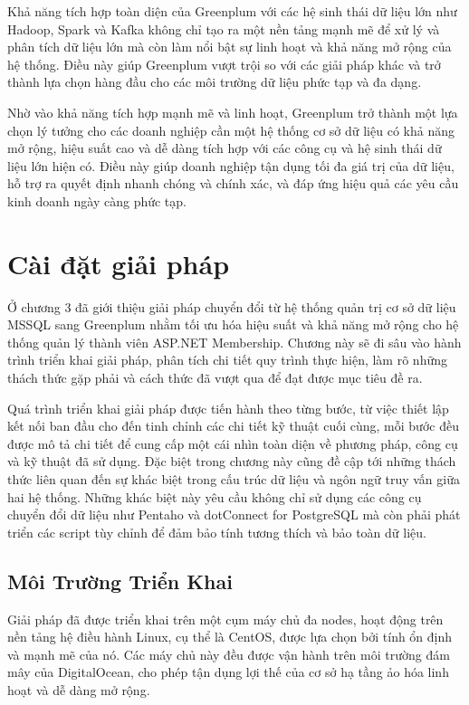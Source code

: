 \documentclass[14pt]{article}
\begin{document}
Khả năng tích hợp toàn diện của Greenplum với các hệ sinh thái dữ liệu lớn như Hadoop, Spark và Kafka không chỉ tạo ra một nền tảng mạnh mẽ để xử lý và phân tích dữ liệu lớn mà còn làm nổi bật sự linh hoạt và khả năng mở rộng của hệ thống. Điều này giúp Greenplum vượt trội so với các giải pháp khác và trở thành lựa chọn hàng đầu cho các môi trường dữ liệu phức tạp và đa dạng.

Nhờ vào khả năng tích hợp mạnh mẽ và linh hoạt, Greenplum trở thành một lựa chọn lý tưởng cho các doanh nghiệp cần một hệ thống cơ sở dữ liệu có khả năng mở rộng, hiệu suất cao và dễ dàng tích hợp với các công cụ và hệ sinh thái dữ liệu lớn hiện có. Điều này giúp doanh nghiệp tận dụng tối đa giá trị của dữ liệu, hỗ trợ ra quyết định nhanh chóng và chính xác, và đáp ứng hiệu quả các yêu cầu kinh doanh ngày càng phức tạp.



\section{Cài đặt giải pháp}

Ở chương 3 đã giới thiệu giải pháp chuyển đổi từ hệ thống quản trị cơ sở dữ liệu MSSQL sang Greenplum nhằm tối ưu hóa hiệu suất và khả năng mở rộng cho hệ thống quản lý thành viên ASP.NET Membership. Chương này sẽ đi sâu vào hành trình triển khai giải pháp, phân tích chi tiết quy trình thực hiện, làm rõ những thách thức gặp phải và cách thức đã vượt qua để đạt được mục tiêu đề ra.

Quá trình triển khai giải pháp được tiến hành theo từng bước, từ việc thiết lập kết nối ban đầu cho đến tinh chỉnh các chi tiết kỹ thuật cuối cùng, mỗi bước đều được mô tả chi tiết để cung cấp một cái nhìn toàn diện về phương pháp, công cụ và kỹ thuật đã sử dụng. Đặc biệt trong chương này cũng đề cập tới những thách thức liên quan đến sự khác biệt trong cấu trúc dữ liệu và ngôn ngữ truy vấn giữa hai hệ thống. Những khác biệt này yêu cầu không chỉ sử dụng các công cụ chuyển đổi dữ liệu như Pentaho và dotConnect for PostgreSQL mà còn phải phát triển các script tùy chỉnh để đảm bảo tính tương thích và bảo toàn dữ liệu.


\subsection{Môi Trường Triển Khai}

Giải pháp đã được triển khai trên một cụm máy chủ đa nodes, hoạt động trên nền tảng hệ điều hành Linux, cụ thể là CentOS, được lựa chọn bởi tính ổn định và mạnh mẽ của nó. Các máy chủ này đều được vận hành trên môi trường đám mây của DigitalOcean, cho phép tận dụng lợi thế của cơ sở hạ tầng ảo hóa linh hoạt và dễ dàng mở rộng.
\end{document}
